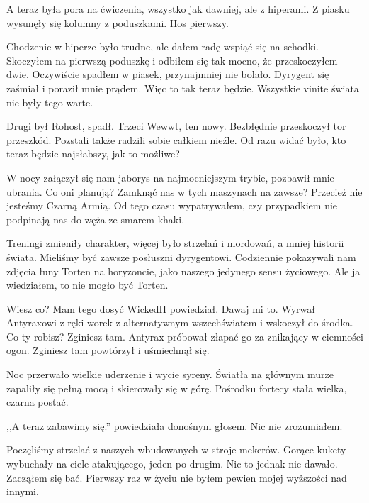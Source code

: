 A teraz była pora na ćwiczenia, wszystko jak dawniej, ale z hiperami.
Z piasku wysunęły się kolumny z poduszkami.
Hos pierwszy.

Chodzenie w hiperze było trudne, ale dałem radę wspiąć się na schodki.
Skoczyłem na pierwszą poduszkę i odbiłem się tak mocno, że przeskoczyłem dwie.
Oczywiście spadłem w piasek, przynajmniej nie bolało.
Dyrygent się zaśmiał i poraził mnie prądem. Więc to tak teraz będzie.
Wszystkie vinite świata nie były tego warte.

Drugi był Rohost, spadł.
Trzeci Wewwt, ten nowy.
Bezbłędnie przeskoczył tor przeszkód.
Pozstali także radzili sobie całkiem nieźle.
Od razu widać było, kto teraz będzie najsłabszy, jak to możliwe?

W nocy załączył się nam jaborys na najmocniejszym trybie, pozbawił mnie ubrania.
Co oni planują? Zamknąć nas w tych maszynach na zawsze? Przecież nie jesteśmy Czarną Armią.
Od tego czasu wypatrywałem, czy przypadkiem nie podpinają nas do węża ze smarem khaki.

Treningi zmieniły charakter, więcej było strzelań i mordowań, a mniej historii świata.
Mieliśmy być zawsze posłuszni dyrygentowi. Codziennie pokazywali nam zdjęcia łuny Torten na horyzoncie, jako naszego jedynego sensu życiowego.
Ale ja wiedziałem, to nie mogło być Torten.

\divider{}

\begin{dialogue}
\ds{} Wiesz co? Mam tego dosyć \dm{} WickedH powiedział. \dm{} Dawaj mi to. \dm{} Wyrwał Antyraxowi z ręki worek z alternatywnym wszechświatem i wskoczył do środka.
\ds{} Co ty robisz? Zginiesz tam. \dm{} Antyrax próbował złapać go za znikający w ciemności ogon. \dm{} Zginiesz tam \dm{} powtórzył i uśmiechnął się.
\end{dialogue}

\divider{}

Noc przerwało wielkie uderzenie i wycie syreny.
Światła na głównym murze zapaliły się pełną mocą i skierowały się w górę.
Pośrodku fortecy stała wielka, czarna postać.

\begin{dialogue}
\ds{} ,,A teraz zabawimy się.'' \dm{} powiedziała donośnym głosem. Nic nie zrozumiałem.
\end{dialogue}

Poczęliśmy strzelać z naszych wbudowanych w stroje mekerów.
Gorące kukety wybuchały na ciele atakującego, jeden po drugim. Nic to jednak nie dawało.
Zacząłem się bać. Pierwszy raz w życiu nie byłem pewien mojej wyższości nad innymi.

